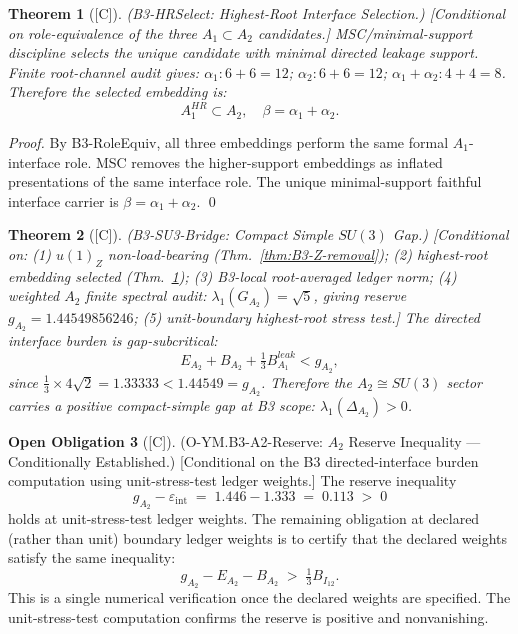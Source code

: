 \documentclass[12pt,oneside]{amsbook}
\theoremstyle{plain}
\newtheorem{theorem}{Theorem}[section]
\theoremstyle{definition}
\newtheorem{obligation}[theorem]{Open Obligation}
\theoremstyle{remark}
\newcommand{\status}[1]{\textup{[#1]}}
\begin{document}
\begin{theorem}[\status{C}]\label{thm:B3-HR-select}
\textup{(B3-HRSelect: Highest-Root Interface Selection.)}
\textup{[Conditional on role-equivalence of the three $A_1\subset A_2$
candidates.]}
MSC/minimal-support discipline selects the unique candidate with
minimal directed leakage support. Finite root-channel audit gives:
$\alpha_1: 6+6=12$; $\alpha_2: 6+6=12$; $\alpha_1+\alpha_2: 4+4=8$.
Therefore the selected embedding is:
\[
 A_1^{HR}\subset A_2, \quad \beta = \alpha_1+\alpha_2.
\]
\end{theorem}

\begin{proof}
By B3-RoleEquiv, all three embeddings perform the same formal
$A_1$-interface role. MSC removes the higher-support embeddings as
inflated presentations of the same interface role. The unique
minimal-support faithful interface carrier is $\beta = \alpha_1+\alpha_2$.
\qed
\end{proof}

\begin{theorem}[\status{C}]\label{thm:B3-SU3-bridge}
\textup{(B3-SU3-Bridge: Compact Simple $SU(3)$ Gap.)}
\textup{[Conditional on: (1) $u(1)_Z$ non-load-bearing (Thm.~\ref{thm:B3-Z-removal});
(2) highest-root embedding selected (Thm.~\ref{thm:B3-HR-select});
(3) B3-local root-averaged ledger norm; (4) weighted $A_2$ finite spectral
audit: $\lambda_1(G_{A_2}) = \sqrt{5}$, giving reserve
$g_{A_2} = 1.44549856246$; (5) unit-boundary highest-root stress test.]}
The directed interface burden is gap-subcritical:
\[
 E_{A_2}+B_{A_2}+\tfrac{1}{3}B_{A_1}^{leak} < g_{A_2},
\]
since $\tfrac{1}{3}\times 4\sqrt{2} = 1.33333 < 1.44549 = g_{A_2}$.
Therefore the $A_2\cong SU(3)$ sector carries a positive compact-simple
gap at B3 scope:
$\lambda_1(\Delta_{A_2}) > 0$.
\end{theorem}

\begin{obligation}[\status{C}]\label{ob:B3-A2-reserve}
\textup{(O-YM.B3-A2-Reserve: $A_2$ Reserve Inequality ---
Conditionally Established.)}
\textup{[Conditional on the B3 directed-interface burden computation
using unit-stress-test ledger weights.]}
The reserve inequality
\[
  g_{A_2} - \varepsilon_{\mathrm{int}} \;=\; 1.446 - 1.333 \;=\; 0.113 \;>\; 0
\]
holds at unit-stress-test ledger weights.  The remaining obligation
at declared (rather than unit) boundary ledger weights is to certify
that the declared weights satisfy the same inequality:
\[
  g_{A_2} - E_{A_2} - B_{A_2} \;>\; \tfrac{1}{3}B_{I_{12}}.
\]
This is a single numerical verification once the declared weights
are specified.  The unit-stress-test computation confirms the
reserve is positive and nonvanishing.
\end{obligation}
\end{document}
